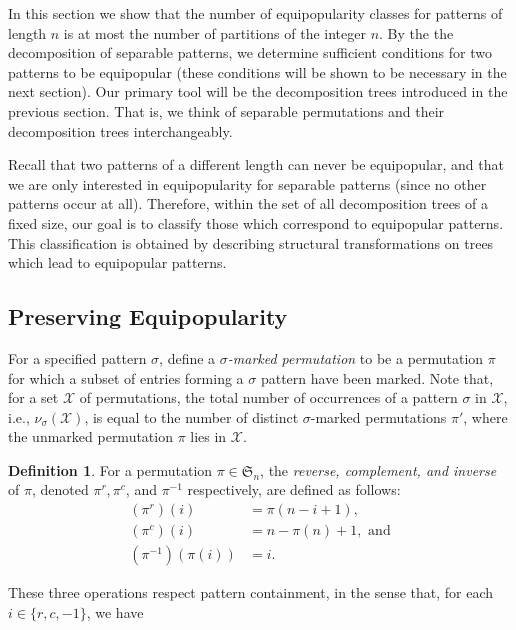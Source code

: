 \documentclass[10pt]{article}
\theoremstyle{definition}
\newtheorem{definition}[theorem]{Definition}
\numberwithin{equation}{section}
\numberwithin{figure}{section}
\begin{document}
In this section we show that the number of equipopularity classes for patterns of length $n$ is at most the number of partitions of the integer $n$. By the the decomposition of separable patterns, we determine sufficient conditions for two patterns to be equipopular (these conditions will be shown to be necessary in the next section). Our primary tool will be the decomposition trees introduced in the previous section. That is, we think of separable permutations and their decomposition trees interchangeably.

Recall that two patterns of a different length can never be equipopular, and that we are only interested in equipopularity for separable patterns (since no other patterns occur at all). Therefore, within the set of all decomposition trees of a fixed size, our goal is to classify those which correspond to equipopular patterns. This classification is obtained by describing structural transformations on trees which lead to equipopular patterns. 

\subsection{Preserving Equipopularity}
  
For a specified pattern $\sigma$, define a \emph{$\sigma$-marked permutation} to be a permutation $\pi$ for which a subset of entries forming a $\sigma$ pattern have been marked. Note that, for a set $\mathcal{X}$ of permutations, the total number of occurrences of a pattern $\sigma$ in $\mathcal{X}$, i.e., $\nu_{\sigma}(\mathcal{X})$, is equal to the number of distinct $\sigma$-marked permutations $\pi'$, where the unmarked permutation $\pi$ lies in $\mathcal{X}$.

\begin{definition}
For a permutation $\pi \in \mathfrak{S}_n$, the \emph{reverse, complement, and inverse} of $\pi$, denoted $\pi^{r}, \pi^{c}$, and $\pi^{-1}$ respectively, are defined as follows:
\[
\begin{aligned}
      (\pi^{r})(i) &= \pi(n-i + 1), \\
      (\pi^{c})(i) &= n - \pi(n) + 1, \text{ and} \\
      (\pi^{-1})(\pi(i)) &= i.
\end{aligned}
\]
\end{definition}

These three operations respect pattern containment, in the sense that, for each $i \in \{r,c,-1\}$, we have 
\end{document}

